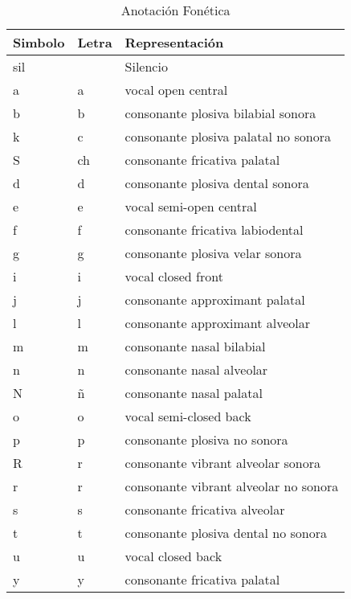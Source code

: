 \begin{table}[]
\caption{Anotación Fonética}
\begin{tabular}{|l|l|l|}
\textbf{Simbolo} & \textbf{Letra} & \textbf{Representación} \\ \hline
sil              & & Silencio                               \\ \hline
a                & a & vocal open central                   \\ \hline
b                & b &  consonante plosiva bilabial sonora   \\ \hline 
k                & c &  consonante plosiva palatal no sonora \\ \hline 
S                & ch &  consonante fricativa palatal        \\ \hline 
d                & d &  consonante plosiva dental sonora     \\ \hline 
e                & e &  vocal semi-open central              \\ \hline
f                & f &  consonante fricativa labiodental     \\ \hline 
g                & g &  consonante plosiva velar sonora      \\ \hline
i                & i &  vocal closed front                   \\ \hline
j                & j &  consonante approximant palatal       \\ \hline
l                & l &  consonante approximant alveolar      \\ \hline 
m                & m &  consonante nasal bilabial            \\ \hline 
n                & n &  consonante nasal alveolar            \\ \hline 
N                & ñ &  consonante nasal palatal             \\ \hline 
o                & o &  vocal semi-closed back               \\ \hline
p                & p &  consonante plosiva no sonora         \\ \hline 
R                & r &  consonante vibrant alveolar sonora   \\ \hline 
r                & r &  consonante vibrant alveolar no sonora \\ \hline
s                & s &  consonante fricativa alveolar         \\ \hline
t                & t &  consonante plosiva dental no sonora   \\ \hline
u                & u &  vocal closed back                    \\ \hline
y                & y &  consonante fricativa palatal         \\ \hline
\end{tabular}
\end{table}